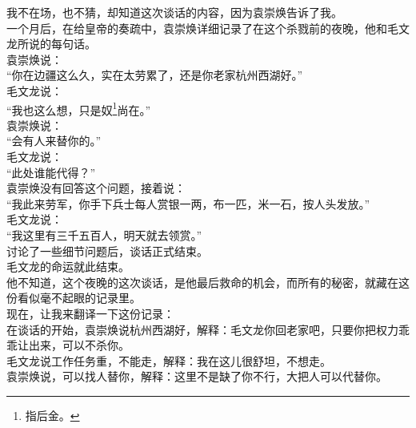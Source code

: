 \begin{multicols}{\theparacolNo}
我不在场，也不猜，却知道这次谈话的内容，因为袁崇焕告诉了我。\\

一个月后，在给皇帝的奏疏中，袁崇焕详细记录了在这个杀戮前的夜晚，他和毛文龙所说的每句话。\\

袁崇焕说：\\

“你在边疆这么久，实在太劳累了，还是你老家杭州西湖好。”\\

毛文龙说：\\

“我也这么想，只是奴\footnote{指后金。}尚在。”\\

袁崇焕说：\\

“会有人来替你的。”\\

毛文龙说：\\

“此处谁能代得？”\\

袁崇焕没有回答这个问题，接着说：\\

“我此来劳军，你手下兵士每人赏银一两，布一匹，米一石，按人头发放。”\\

毛文龙说：\\

“我这里有三千五百人，明天就去领赏。”\\

讨论了一些细节问题后，谈话正式结束。\\

毛文龙的命运就此结束。\\

他不知道，这个夜晚的这次谈话，是他最后救命的机会，而所有的秘密，就藏在这份看似毫不起眼的记录里。\\

现在，让我来翻译一下这份记录：\\

在谈话的开始，袁崇焕说杭州西湖好，解释：毛文龙你回老家吧，只要你把权力乖乖让出来，可以不杀你。\\

毛文龙说工作任务重，不能走，解释：我在这儿很舒坦，不想走。\\

袁崇焕说，可以找人替你，解释：这里不是缺了你不行，大把人可以代替你。\\


\end{multicols}
